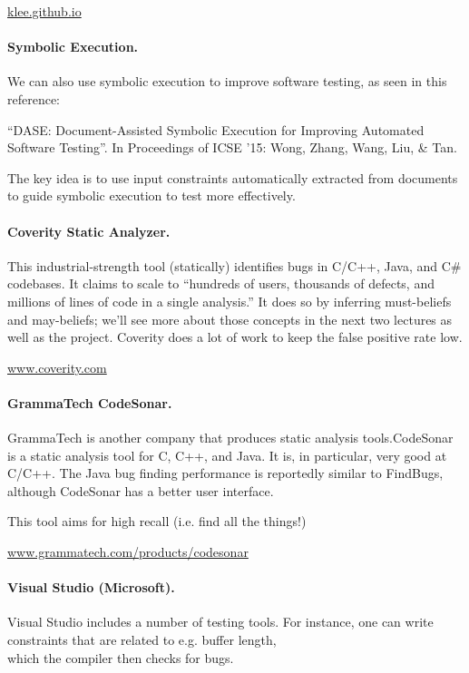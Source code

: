 \documentclass[11pt]{article}
\begin{document}
\begin{center}\url{klee.github.io}
  \end{center}

\paragraph{Symbolic Execution.} We can also use symbolic execution to improve
software testing, as seen in this reference:

``DASE: Document-Assisted Symbolic Execution for Improving Automated Software Testing''.
In Proceedings of ICSE '15: Wong, Zhang, Wang, Liu, \& Tan.

The key idea is to use input constraints automatically extracted from documents to guide symbolic
  execution to test more effectively.

\paragraph{Coverity Static Analyzer.} This industrial-strength tool (statically) identifies bugs in C/C++, Java, and C\# codebases. It claims to scale to ``hundreds of users, thousands of defects, and millions of lines of code in a single analysis.'' It does so by inferring must-beliefs and may-beliefs; we'll see more about those concepts in the next two lectures as well as the project. Coverity does a lot of work to keep the false positive rate low.

\begin{center}
  \url{www.coverity.com}
\end{center}

\paragraph{GrammaTech CodeSonar.} GrammaTech is another company that produces static analysis tools.CodeSonar is a static analysis tool for C, C++, and Java. It is, in particular, very good at C/C++.  The Java bug finding performance is reportedly similar to FindBugs, although CodeSonar has a better user interface.

This tool aims for high recall (i.e. find all the things!)

\begin{center}
  \url{www.grammatech.com/products/codesonar}
\end{center}

\paragraph{Visual Studio (Microsoft).} Visual Studio includes a number of testing tools. For instance, one can write constraints that are related to e.g. buffer length, \\
    which the compiler then checks for bugs.
\end{document}
